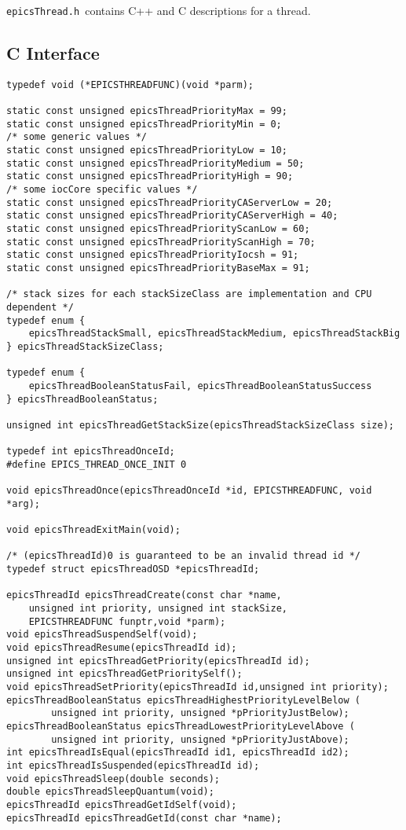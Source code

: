 \verb|epicsThread.h |contains C++ and C descriptions for a thread.

\subsection{C Interface}

\begin{verbatim}
typedef void (*EPICSTHREADFUNC)(void *parm);

static const unsigned epicsThreadPriorityMax = 99;
static const unsigned epicsThreadPriorityMin = 0;
/* some generic values */
static const unsigned epicsThreadPriorityLow = 10;
static const unsigned epicsThreadPriorityMedium = 50;
static const unsigned epicsThreadPriorityHigh = 90;
/* some iocCore specific values */
static const unsigned epicsThreadPriorityCAServerLow = 20;
static const unsigned epicsThreadPriorityCAServerHigh = 40;
static const unsigned epicsThreadPriorityScanLow = 60;
static const unsigned epicsThreadPriorityScanHigh = 70;
static const unsigned epicsThreadPriorityIocsh = 91;
static const unsigned epicsThreadPriorityBaseMax = 91;

/* stack sizes for each stackSizeClass are implementation and CPU dependent */
typedef enum {
    epicsThreadStackSmall, epicsThreadStackMedium, epicsThreadStackBig
} epicsThreadStackSizeClass;

typedef enum {
    epicsThreadBooleanStatusFail, epicsThreadBooleanStatusSuccess
} epicsThreadBooleanStatus;

unsigned int epicsThreadGetStackSize(epicsThreadStackSizeClass size);

typedef int epicsThreadOnceId;
#define EPICS_THREAD_ONCE_INIT 0

void epicsThreadOnce(epicsThreadOnceId *id, EPICSTHREADFUNC, void *arg);

void epicsThreadExitMain(void);

/* (epicsThreadId)0 is guaranteed to be an invalid thread id */
typedef struct epicsThreadOSD *epicsThreadId;

epicsThreadId epicsThreadCreate(const char *name,
    unsigned int priority, unsigned int stackSize,
    EPICSTHREADFUNC funptr,void *parm);
void epicsThreadSuspendSelf(void);
void epicsThreadResume(epicsThreadId id);
unsigned int epicsThreadGetPriority(epicsThreadId id);
unsigned int epicsThreadGetPrioritySelf();
void epicsThreadSetPriority(epicsThreadId id,unsigned int priority);
epicsThreadBooleanStatus epicsThreadHighestPriorityLevelBelow (
        unsigned int priority, unsigned *pPriorityJustBelow);
epicsThreadBooleanStatus epicsThreadLowestPriorityLevelAbove (
        unsigned int priority, unsigned *pPriorityJustAbove);
int epicsThreadIsEqual(epicsThreadId id1, epicsThreadId id2);
int epicsThreadIsSuspended(epicsThreadId id);
void epicsThreadSleep(double seconds);
double epicsThreadSleepQuantum(void);
epicsThreadId epicsThreadGetIdSelf(void);
epicsThreadId epicsThreadGetId(const char *name);


\end{verbatim}
